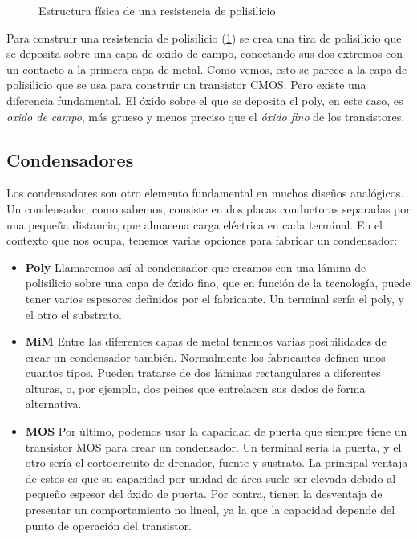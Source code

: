 \begin{figure}[h]
	\centering
	
	\caption{Estructura física de una resistencia de polisilicio}
	\label{fig:poly_res}
\end{figure}

Para construir una resistencia de polisilicio (\ref{fig:poly_res}) se crea una tira de polisilicio
que se deposita sobre una capa de oxido de campo, conectando sus dos extremos con
un contacto a la primera capa de metal. Como vemos, esto se parece a la capa de
polisilicio que se usa para construir un transistor CMOS. Pero existe una diferencia
fundamental. El óxido sobre el que se deposita el poly, en este caso, es \textit{oxido de
campo}, más grueso y menos preciso que el \textit{óxido fino} de los transistores.\\

\subsection{Condensadores}\label{cap:condensadores}

Los condensadores son otro elemento fundamental en muchos diseños analógicos. Un
condensador, como sabemos, consiste en dos placas conductoras separadas por una pequeña
distancia, que almacena carga eléctrica en cada terminal.
En el contexto que nos ocupa, tenemos varias opciones para fabricar un condensador:\\

\begin{itemize}
	\item \textbf{Poly}
	Llamaremos así al condensador que creamos con una lámina de polisilicio sobre una
	capa de óxido fino, que en función de la tecnología, puede tener varios espesores
	definidos por el fabricante. Un terminal sería el poly, y el otro el substrato.

	\item \textbf{MiM}
	Entre las diferentes capas de metal tenemos varias posibilidades de crear un condensador
	también. Normalmente los fabricantes definen unos cuantos tipos. Pueden tratarse de
	dos láminas rectangulares a diferentes alturas, o, por ejemplo, dos peines que
	entrelacen sus dedos de forma alternativa.

	\item \textbf{MOS}
	Por último, podemos usar la capacidad de puerta que siempre tiene un transistor MOS
	para crear un condensador. Un terminal sería la puerta, y el otro sería el cortocircuito
	de drenador, fuente y sustrato. La principal ventaja de estos es que su capacidad por
	unidad de área suele ser elevada debido al pequeño espesor del óxido de puerta. Por contra,
	tienen la desventaja de presentar un comportamiento no lineal, ya la que la capacidad
	depende del punto de operación del transistor.
\end{itemize}

